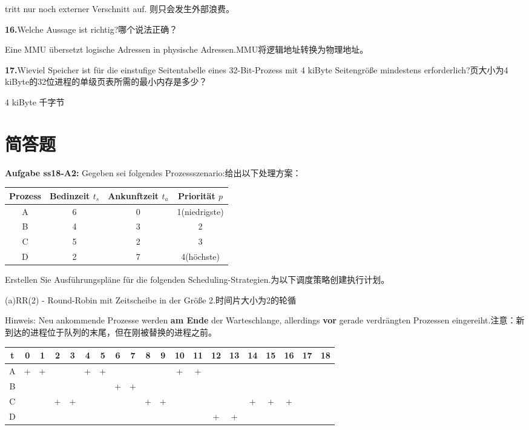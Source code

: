 \documentclass[fleqn]{article}
\begin{document}
tritt nur noch externer Verschnitt auf. 则只会发生外部浪费。

\textbf{16.}Welche Aussage ist richtig?哪个说法正确？

Eine MMU übersetzt logische Adressen in physische Adressen.MMU将逻辑地址转换为物理地址。

\textbf{17.}Wieviel Speicher ist für die einstufige Seitentabelle eines 32-Bit-Prozess mit 4 kiByte Seitengröße mindestens erforderlich?页大小为4 kiByte的32位进程的单级页表所需的最小内存是多少？

4 kiByte 千字节

\section{简答题}

\noindent\textbf{Aufgabe ss18-A2:}
Gegeben sei folgendes Prozessszenario:给出以下处理方案：

\begin{center}
    \begin{tabular}{|c|c|c|c|}
        \hline
        Prozess&Bedinzeit $t_s$&Ankunftzeit $t_a$&Priorität $p$\\
        \hline
        A&6&0&1(niedrigste)\\
        B&4&3&2\\
        C&5&2&3\\
        D&2&7&4(höchste)\\
        \hline
    \end{tabular}
\end{center}

\indent Erstellen Sie Ausführungspläne für die folgenden Scheduling-Strategien.为以下调度策略创建执行计划。

\indent (a)RR(2) - Round-Robin mit Zeitscheibe in der Größe 2.时间片大小为2的轮循

\indent Hinweis: Neu ankommende Prozesse werden \textbf{am Ende} der Warteschlange, 
allerdings \textbf{vor} gerade verdrängten Prozessen eingereiht.注意：新到达的进程位于队列的末尾，但在刚被替换的进程之前。

\begin{center}
    \begin{tabular}{|c||c|c|c|c|c|c|c|c|c|c|c|c|c|c|c|c|c|c|c|}
        \hline
        t&0&1&2&3&4&5&6&7&8&9&10&11&12&13&14&15&16&17&18\\
        \hline
        A&+&+&&&+&+&&&&&+&+&&&&&&&\\
        \hline
        B&&&&&&&+&+&&&&&&&&&&&\\
        \hline
        C&&&+&+&&&&&+&+&&&&&+&+&+&&\\
        \hline
        D&&&&&&&&&&&&&+&+&&&&&\\
        \hline
    \end{tabular}
\end{center}
\end{document}
